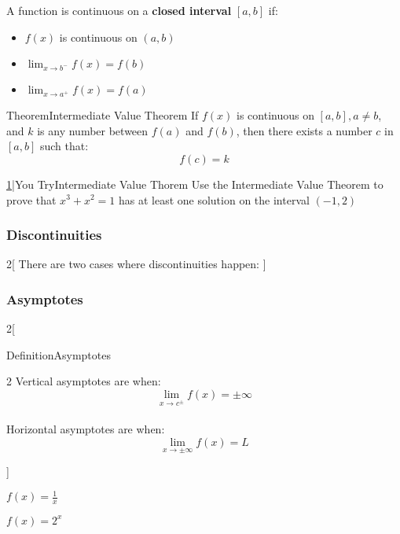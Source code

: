 \documentclass{MathNotes}
\newenvironment{definition}[1]{\begin{RedBox}{Definition}{#1}}{\end{RedBox}}
\newenvironment{theorem}[1]{\begin{GrayBox}{Theorem}{#1}}{\end{GrayBox}}
\newenvironment{practice}[2]{\begin{PurpleBox}{\texorpdfstring{#1}\Big|You Try}{#2}}{\end{PurpleBox}}
\begin{document}
A function is continuous on a \textbf{closed interval} $[a, b]$ if:
\begin{itemize}
	\item $f(x)$ is continuous on $(a, b)$
	\item $\lim_{x\to b^-}f(x)=f(b)$
	\item $\lim_{x\to a^+}f(x)=f(a)$
\end{itemize}

\begin{theorem}{Intermediate Value Theorem}
	If $f(x)$ is continuous on $[a, b], a\neq b$, and $k$ is any number
	between $f(a)$ and $f(b)$, then there exists a number $c$ in
	$[a, b]$ such that: $$f(c)=k$$
\end{theorem}

\begin{practice}{\hyperref[ans:1.3.1-1]{1}}{Intermediate Value Thorem}
	\label{prac:1.3.1-1}
	Use the Intermediate Value Theorem to prove that $x^3+x^2=1$ has at least
	one solution on the interval $(-1, 2)$
\end{practice}

\subsubsection{Discontinuities}

\begin{center}
	\begin{multicols}{2}[
			There are two cases where discontinuities happen: 
		]
		
		
	\end{multicols}
\end{center}

\newpage
\subsubsection{Asymptotes}
\begin{multicols}{2}[
		\begin{definition}{Asymptotes}
			\begin{multicols}{2}{
					Vertical asymptotes are when:
					\begin{displaymath}
						\lim_{x\to c^\pm}f(x)=\pm\infty
					\end{displaymath}
					\\
				}
				{
					Horizontal asymptotes are when:
					\begin{displaymath}
						\lim_{x\to \pm\infty}f(x)=L
					\end{displaymath}
				}
			\end{multicols}
		\end{definition}
	]{
		\begin{center}
			
			$f(x)=\frac{1}{x}$
		\end{center}
	}
	{
		\begin{center}
			
			$f(x)=2^x$
		\end{center}
	}
\end{multicols}
\end{document}
